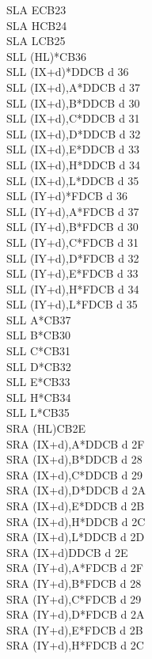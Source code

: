 \documentclass[oneside,a4paper]{book}
\begin{document}
\begin{multicols}{3}
{\begin{tabbing}
SLA E\>CB23\\
SLA H\>CB24\\
SLA L\>CB25\\
SLL (HL)*\>CB36\\
SLL (IX+d)*\>DDCB d 36\\
SLL (IX+d),A*\>DDCB d 37\\
SLL (IX+d),B*\>DDCB d 30\\
SLL (IX+d),C*\>DDCB d 31\\
SLL (IX+d),D*\>DDCB d 32\\
SLL (IX+d),E*\>DDCB d 33\\
SLL (IX+d),H*\>DDCB d 34\\
SLL (IX+d),L*\>DDCB d 35\\
SLL (IY+d)*\>FDCB d 36\\
SLL (IY+d),A*\>FDCB d 37\\
SLL (IY+d),B*\>FDCB d 30\\
SLL (IY+d),C*\>FDCB d 31\\
SLL (IY+d),D*\>FDCB d 32\\
SLL (IY+d),E*\>FDCB d 33\\
SLL (IY+d),H*\>FDCB d 34\\
SLL (IY+d),L*\>FDCB d 35\\
SLL A*\>CB37\\
SLL B*\>CB30\\
SLL C*\>CB31\\
SLL D*\>CB32\\
SLL E*\>CB33\\
SLL H*\>CB34\\
SLL L*\>CB35\\
SRA (HL)\>CB2E\\
SRA (IX+d),A*\>DDCB d 2F\\
SRA (IX+d),B*\>DDCB d 28\\
SRA (IX+d),C*\>DDCB d 29\\
SRA (IX+d),D*\>DDCB d 2A\\
SRA (IX+d),E*\>DDCB d 2B\\
SRA (IX+d),H*\>DDCB d 2C\\
SRA (IX+d),L*\>DDCB d 2D\\
SRA (IX+d)\>DDCB d 2E\\
SRA (IY+d),A*\>FDCB d 2F\\
SRA (IY+d),B*\>FDCB d 28\\
SRA (IY+d),C*\>FDCB d 29\\
SRA (IY+d),D*\>FDCB d 2A\\
SRA (IY+d),E*\>FDCB d 2B\\
SRA (IY+d),H*\>FDCB d 2C\\

\end{tabbing}}
\end{multicols}
\end{document}

